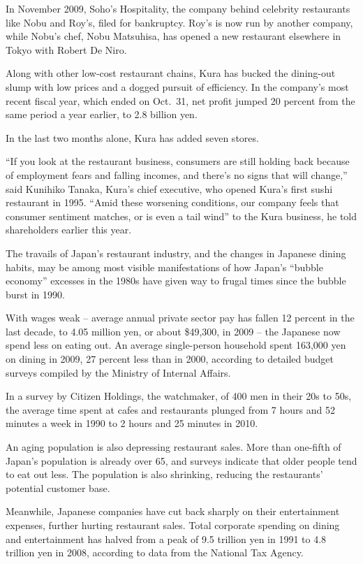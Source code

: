 ﻿\documentclass[12pt]{article}
\begin{document}
In November 2009, Soho's Hospitality, the company behind celebrity restaurants like Nobu and Roy's,
filed for bankruptcy. Roy's is now run by another company, while Nobu's chef, Nobu Matsuhisa, has
opened a new restaurant elsewhere in Tokyo with Robert De Niro.

Along with other low-cost restaurant chains, Kura has bucked the dining-out slump with low prices
and a dogged pursuit of efficiency. In the company's most recent fiscal year, which ended on
Oct.~31, net profit jumped 20 percent from the same period a year earlier, to 2.8 billion yen.

In the last two months alone, Kura has added seven stores.

``If you look at the restaurant business, consumers are still holding back because of employment
fears and falling incomes, and there's no signs that will change,'' said Kunihiko Tanaka, Kura's
chief executive, who opened Kura's first sushi restaurant in 1995. ``Amid these worsening
conditions, our company feels that consumer sentiment matches, or is even a tail wind'' to the Kura
business, he told shareholders earlier this year.

The travails of Japan's restaurant industry, and the changes in Japanese dining habits, may be among
most visible manifestations of how Japan's ``bubble economy'' excesses in the 1980s have given way
to frugal times since the bubble burst in 1990.

With wages weak -- average annual private sector pay has fallen 12 percent in the last decade, to
4.05 million yen, or about \$49,300, in 2009 -- the Japanese now spend less on eating out. An
average single-person household spent 163,000 yen on dining in 2009, 27 percent less than in 2000,
according to detailed budget surveys compiled by the Ministry of Internal Affairs.

In a survey by Citizen Holdings, the watchmaker, of 400 men in their 20s to 50s, the average time
spent at cafes and restaurants plunged from 7 hours and 52 minutes a week in 1990 to 2 hours and 25
minutes in 2010.

An aging population is also depressing restaurant sales. More than one-fifth of Japan's population
is already over 65, and surveys indicate that older people tend to eat out less. The population is
also shrinking, reducing the restaurants' potential customer base.

Meanwhile, Japanese companies have cut back sharply on their entertainment expenses, further hurting
restaurant sales. Total corporate spending on dining and entertainment has halved from a peak of 9.5
trillion yen in 1991 to 4.8 trillion yen in 2008, according to data from the National Tax Agency.
\end{document}
